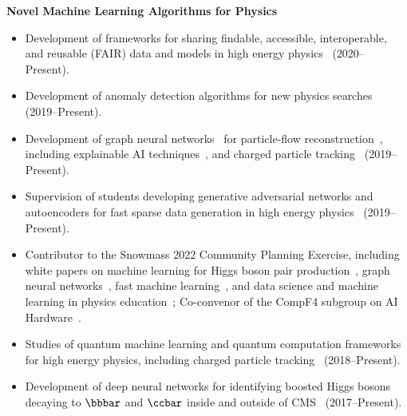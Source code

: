 \documentclass[11pt]{res}
\begin{document}
\begin{resume}
  \textbf{Novel Machine Learning Algorithms for Physics}
  \begin{itemize}
    \itemsep-0.3em
    \item Development of frameworks for sharing findable, accessible, interoperable, and reusable (FAIR) data and models in high energy physics~\cite{Chen:2021euv} ({2020--Present}).
    \item Development of anomaly detection algorithms for new physics searches~\cite{Govorkova:2021utb,Jawahar:2021vyu,Aarrestad:2021oeb,Tsan:2021brw,Kasieczka:2021xcg,Wozniak:2020} ({2019--Present}).
    \item Development of graph neural networks~\cite{Duarte:2020ngm} for particle-flow reconstruction~\cite{Pata:2022wam,CMS-DP-2021-030,Pata:2021oez}, including explainable AI techniques~\cite{Mokhtar:2021bkf}, and charged particle tracking~\cite{Elabd:2021lgo,Dezoort:2021kfk,Heintz:2020soy} ({2019--Present}).
    \item Supervision of students developing generative adversarial networks and autoencoders for fast sparse data generation in high energy physics~\cite{Touranakou:2022qrp,Kansal:2021cqp,Orzari:2021suh,Kansal:2020svm} ({2019--Present}).
    \item Contributor to the Snowmass 2022 Community Planning Exercise, including white papers on machine learning for Higgs boson pair production~\cite{Apresyan:2022tqw}, graph neural networks~\cite{Thais:2022iok}, fast machine learning~\cite{Harris:2022qtm}, and data science and machine learning in physics education~\cite{Benelli:2022sqn}; Co-convenor of the CompF4 subgroup on AI Hardware~\cite{Bhimij:2022xyn}.
    \item Studies of quantum machine learning and quantum computation frameworks for high energy physics, including charged particle tracking~\cite{Zlokapa:2019tkn} ({2018--Present}).
    \item Development of deep neural networks for identifying boosted Higgs bosons decaying to $\bbbar$ and $\ccbar$ inside and outside of  CMS~\cite{Moreno:2019neq,Moreno:2019bmu,neurips2019_hbb,CMS-DP-2018-046} ({2017--Present}).
  \end{itemize}


\end{resume}
\end{document}
